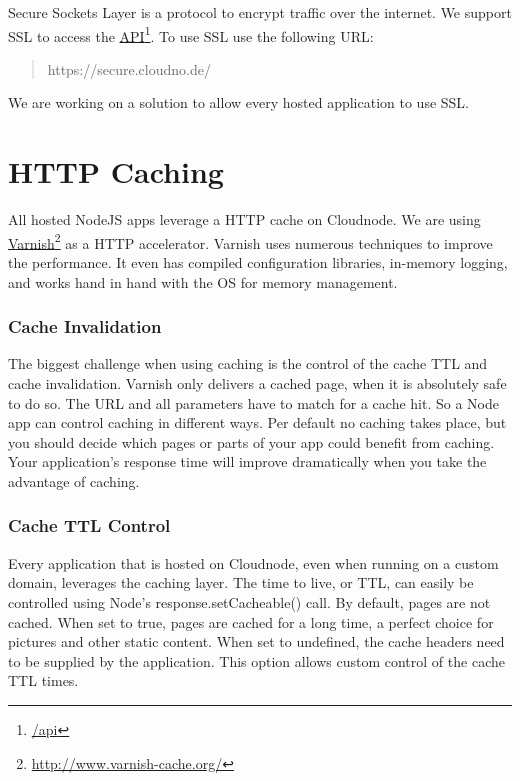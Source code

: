 Secure Sockets Layer is a protocol to encrypt traffic over the internet. We support SSL to access the \href{/api}{API}\footnote{\href{/api}{\slash api}}. To use SSL use the following URL:

\begin{quote}

https:/\slash secure.cloudno.de\slash 
\end{quote}

We are working on a solution to allow every hosted application to use SSL.

\chapter{HTTP Caching}
\label{httpcaching}

All hosted NodeJS apps leverage a HTTP cache on Cloudnode. We are using \href{http://www.varnish-cache.org/}{Varnish}\footnote{\href{http://www.varnish-cache.org/}{http:/\slash www.varnish-cache.org\slash }} as a HTTP accelerator. Varnish uses numerous techniques to improve the performance. It even has compiled configuration libraries, in-memory logging, and works hand in hand with the OS for memory management.

\subsection{Cache Invalidation}
\label{cacheinvalidation}

The biggest challenge when using caching is the control of the cache TTL and cache invalidation. Varnish only delivers a cached page, when it is absolutely safe to do so. The URL and all parameters have to match for a cache hit. So a Node app can control caching in different ways. Per default no caching takes place, but you should decide which pages or parts of your app could benefit from caching. Your application's response time will improve dramatically when you take the advantage of caching.

\subsection{Cache TTL Control}
\label{cachettlcontrol}

Every application that is hosted on Cloudnode, even when running on a custom domain, leverages the caching layer. The time to live, or TTL, can easily be controlled using Node's response.setCacheable() call. By default, pages are not cached. When set to true, pages are cached for a long time, a perfect choice for pictures and other static content. When set to undefined, the cache headers need to be supplied by the application. This option allows custom control of the cache TTL times.

